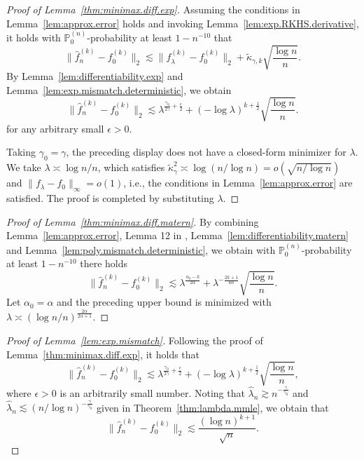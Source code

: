 \documentclass[12pt]{article}
\newcommand{\PP}{\mathbb{P}}
\theoremstyle{plain}
\theoremstyle{nonitalicremark}
\begin{document}
\begin{appendices}
\begin{proof}[Proof of Lemma~\ref{thm:minimax.diff.exp}]
Assuming the conditions in Lemma~\ref{lem:approx.error} holds and invoking Lemma~\ref{lem:exp.RKHS.derivative}, it holds with $\PP_0^{(n)}$-probability at least $1 - n^{-10}$ that
\begin{equation}
\|\hat{f}_n^{(k)}-f_0^{(k)}\|_2 \lesssim\|f_\lambda^{(k)}-f_0^{(k)}\|_2 + \tilde\kappa_{\gamma,k} \sqrt{\frac{\log n}{n}}.
\end{equation}
By Lemma~\ref{lem:differentiability.exp} and Lemma~\ref{lem:exp.mismatch.deterministic}, we obtain
\begin{equation}
\|\hat{f}_n^{(k)}-f_0^{(k)}\|_2 \lesssim \lambda^{\frac{\gamma_0}{2\gamma} + \frac{\epsilon}{2}}
+(-\log\lambda)^{k+\frac 12}\sqrt{\frac{\log n}{n}}.
\end{equation}
for any arbitrary small $\epsilon > 0$.

Taking $\gamma_0 = \gamma$, the preceding display does not have a closed-form minimizer for $\lambda$. We take $\lambda\asymp \log n/n$, which satisfies $\tilde{\kappa}_\gamma^2\asymp \log (n/\log n)=o(\sqrt{n/\log n})$ and $\|f_\lambda - f_0\|_\infty = o(1)$, i.e., the conditions in Lemma~\ref{lem:approx.error} are satisfied. The proof is completed by substituting $\lambda$.
\end{proof}


\begin{proof}[Proof of Lemma~\ref{thm:minimax.diff.matern}]
By combining Lemma~\ref{lem:approx.error}, Lemma 12 in \cite{liu2020non}, Lemma~\ref{lem:differentiability.matern} and Lemma~\ref{lem:poly.mismatch.deterministic}, we obtain with $\PP_0^{(n)}$-probability at least $1-n^{-10}$ there holds 
\begin{equation}
\|\hat f_n^{(k)} - f_0^{(k)}\|_2 \lesssim \lambda^{\frac{\alpha_0-k}{2\alpha}} + \lambda^{-\frac{2k+1}{4\alpha}} \sqrt{\frac{\log n}{n}}.
\end{equation}
Let $\alpha_0 = \alpha$ and the preceding upper bound is minimized with $\lambda\asymp ({\log n}/{n})^{\frac{2\alpha}{2\alpha+1}}$.
\end{proof}


\begin{proof}[Proof of Lemma~\ref{lem:exp.mismatch}]
Following the proof of Lemma~\ref{thm:minimax.diff.exp}, it holds that
\begin{equation}
\|\hat f_n^{(k)} - f_0^{(k)}\|_2 \lesssim \lambda^{\frac{\gamma_0}{2\gamma}+\frac{\epsilon}{2}} + (-\log\lambda)^{k+\frac{1}{2}} \sqrt{\frac{\log n}{n}},
\end{equation}
where $\epsilon>0$ is an arbitrarily small number. Noting that $\hat\lambda_n \gtrsim n^{-\frac{\gamma}{\gamma_0}}$ and $ \hat\lambda_n \lesssim (n/\log n)^{-\frac{\gamma}{\gamma_0}}$ given in Theorem~\ref{thm:lambda.mmle}, we obtain that
\begin{equation}
\|\hat f_n^{(k)} - f_0^{(k)}\|_2 \lesssim \frac{(\log n)^{k+1}}{\sqrt{n}}.
\end{equation}
\end{proof}



\end{appendices}
\end{document}
